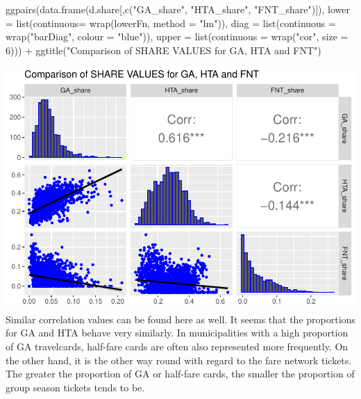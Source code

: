 \documentclass[
]{article}
\newenvironment{Shaded}{\begin{snugshade}}{\end{snugshade}}
\newcommand{\AttributeTok}[1]{\textcolor[rgb]{0.77,0.63,0.00}{#1}}
\newcommand{\DecValTok}[1]{\textcolor[rgb]{0.00,0.00,0.81}{#1}}
\newcommand{\FunctionTok}[1]{\textcolor[rgb]{0.00,0.00,0.00}{#1}}
\newcommand{\NormalTok}[1]{#1}
\newcommand{\SpecialCharTok}[1]{\textcolor[rgb]{0.00,0.00,0.00}{#1}}
\newcommand{\StringTok}[1]{\textcolor[rgb]{0.31,0.60,0.02}{#1}}
\begin{document}
\begin{Shaded}
\begin{Highlighting}[]
\FunctionTok{ggpairs}\NormalTok{(}\FunctionTok{data.frame}\NormalTok{(d.share[,}\FunctionTok{c}\NormalTok{(}\StringTok{"GA\_share"}\NormalTok{, }\StringTok{"HTA\_share"}\NormalTok{, }\StringTok{"FNT\_share"}\NormalTok{)]),}
        \AttributeTok{lower =} \FunctionTok{list}\NormalTok{(}\AttributeTok{continuous=} \FunctionTok{wrap}\NormalTok{(lowerFn, }\AttributeTok{method =} \StringTok{"lm"}\NormalTok{)),}
        \AttributeTok{diag =} \FunctionTok{list}\NormalTok{(}\AttributeTok{continuous =} \FunctionTok{wrap}\NormalTok{(}\StringTok{"barDiag"}\NormalTok{, }\AttributeTok{colour =} \StringTok{"blue"}\NormalTok{)),}
        \AttributeTok{upper =} \FunctionTok{list}\NormalTok{(}\AttributeTok{continuous =} \FunctionTok{wrap}\NormalTok{(}\StringTok{"cor"}\NormalTok{, }\AttributeTok{size =} \DecValTok{6}\NormalTok{))) }\SpecialCharTok{+} 
  \FunctionTok{ggtitle}\NormalTok{(}\StringTok{"Comparison of SHARE VALUES for GA, HTA and FNT"}\NormalTok{) }
\end{Highlighting}
\end{Shaded}

\includegraphics{Influence_factors_files/figure-latex/2.33_share_comparison-1.pdf}
Similar correlation values can be found here as well. It seems that the
proportions for GA and HTA behave very similarly. In municipalities with
a high proportion of GA travelcards, half-fare cards are often also
represented more frequently. On the other hand, it is the other way
round with regard to the fare network tickets. The greater the
proportion of GA or half-fare cards, the smaller the proportion of group
season tickets tends to be.
\end{document}

